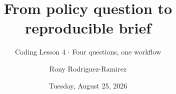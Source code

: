 \title[API 209 \(\cdot\) MATH CAMP 2026 \(\cdot\) LESSON 4]{From policy question to reproducible brief}
\subtitle{Coding Lesson 4 \(\cdot\) Four questions, one workflow}
\author{Rony Rodriguez-Ramirez}
\date{Tuesday, August 25, 2026}

